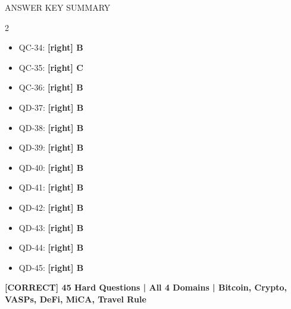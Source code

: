 \documentclass[11pt,a4paper]{beamer}
\newcommand{\greennote}[1]{\textcolor{green!50!black}{\textbf{[CORRECT] #1}}}
\newcommand{\correct}[1]{\textcolor{green!50!black}{\textbf{[right] #1}}}
\begin{document}
\begin{frame}{ANSWER KEY SUMMARY}
\begin{multicols}{2}
\begin{itemize}
    \item QC-34: \correct{B}
    \item QC-35: \correct{C}
    \item QC-36: \correct{B}
    \item QD-37: \correct{B}
    \item QD-38: \correct{B}
    \item QD-39: \correct{B}
    \item QD-40: \correct{B}
    \item QD-41: \correct{B}
    \item QD-42: \correct{B}
    \item QD-43: \correct{B}
    \item QD-44: \correct{B}
    \item QD-45: \correct{B}
\end{itemize}
\end{multicols}
\vspace{0.3cm}
\centering
\greennote{45 Hard Questions | All 4 Domains | Bitcoin, Crypto, VASPs, DeFi, MiCA, Travel Rule}
\end{frame}
\end{document}
